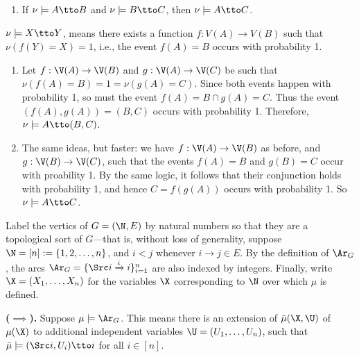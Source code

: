 \begin{subappendices}
\begin{lemma}
\begin{enumerate}
        \item 
        If $\nu \models A \tto B$ and $\nu \models B \tto C$, then $\nu \models A \tto C$. 
    \end{enumerate}
\end{lemma}
\begin{lproof}
$\nu \models X \tto Y$, means there exists a function $f : V(A) \to V(B)$ such that $\nu( f(Y) = X ) = 1$, i.e., the event $f(A) = B$  occurs with probability 1.
\begin{enumerate}
    \item Let $f : \V(A) \to \V(B)$ and $g : \V(A) \to \V(C)$ be such that $\nu(f(A) = B) = 1 = \nu(g(A) = C)$. Since both events happen with probability 1, so must the event $f(A) = B \cap g(A) = C$. Thus the event $(f(A), g(A)) = (B,C)$ occurs with probability 1.  Therefore, $\nu \models A \tto (B,C)$. 
    \item The same ideas, but faster: we have $f : \V(A) \to \V(B)$ as before, and $g : \V(B) \to \V(C)$, such that the events $f(A) = B$ and $g(B) = C$ occur with proability 1. By the same logic, it follows that their conjunction holds with probability 1, and hence $C = f(g(A))$ occurs with probability 1. So $\nu \models A \tto C$. 
    \qedhere
\end{enumerate}
\end{lproof}

\begin{lproof}
    \label{proof:bns}
    Label the vertics of $G = (\N, E)$ by natural numbers so that they are a topological sort of $G$---that is, without loss of generality, suppose $\N = [n] := \{1, 2, \ldots, n\}$, and $i < j$ whenever  $i \to j \in E$. 
    By the definition of $\Ar_G$, 
    the arcs $\Ar_G = \{ \Src i \xrightarrow{i} i \}_{i=1}^n$ are also indexed by integers.
    Finally, write $\X = (X_1, \ldots, X_n)$ for the variables $\X$ corresponding to $\N$ over which $\mu$ is defined. 
    
    \textbf{($\implies$).}
    Suppose $\mu \models \Ar_G$. 
    This means there
    is an extension of $\bar\mu(\X, \U)$ of $\mu(\X)$ to additional
        independent variables $\U = (U_1, \ldots, U_n)$, such that $\bar\mu \models (\Src i, U_i) \tto i$ for all $i \in [n]$. 
    

\end{lproof}
\end{subappendices}
